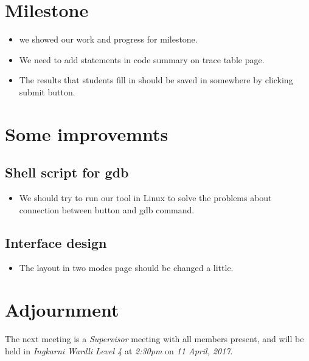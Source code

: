 \documentclass[11pt, a4paper]{article}
\begin{document}
\section{Milestone}
\begin{itemize}
\item we showed our work and progress for milestone.
\item We need to add statements in code summary on trace table page.
\item The results that students fill in should be saved in somewhere by clicking submit button.

\end{itemize}

\section{Some improvemnts}
\subsection{Shell script for gdb}
\begin{itemize}
\item We should try to run our tool in Linux to solve the problems about connection between button and gdb command.
\end{itemize}

\subsection{Interface design}
\begin{itemize}
\item The layout in two modes page should be changed a little.
\end{itemize}


\section{Adjournment}
The next meeting is a \emph{Supervisor} meeting with all members present, and will be held in \emph{Ingkarni Wardli Level 4} at \emph{2:30pm} on \emph{11 April, 2017}.
\end{document}
